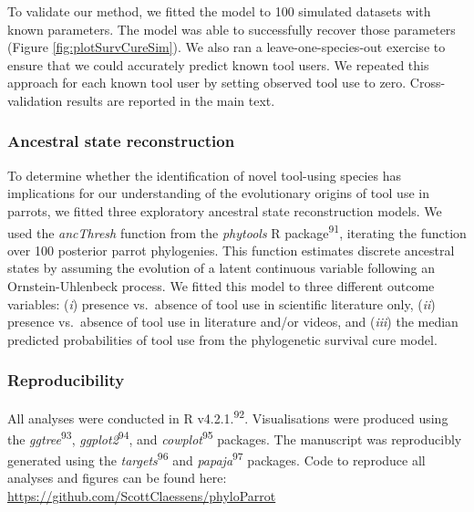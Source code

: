 \documentclass[
  man, donotrepeattitle,floatsintext]{apa6}
\begin{document}
To validate our method, we fitted the model to 100 simulated datasets with known
parameters. The model was able to successfully recover those parameters
(Figure \ref{fig:plotSurvCureSim}). We also ran a
leave-one-species-out exercise to ensure that we could accurately predict known
tool users. We repeated this approach for each known tool user by setting
observed tool use to zero. Cross-validation results are reported in the main
text.

\hypertarget{ancestral-state-reconstruction}{%
\subsubsection{Ancestral state reconstruction}\label{ancestral-state-reconstruction}}

To determine whether the identification of novel tool-using species has
implications for our understanding of the evolutionary origins of tool use in
parrots, we fitted three exploratory ancestral state reconstruction models. We
used the \emph{ancThresh} function from the \emph{phytools} R package\textsuperscript{91},
iterating the function over 100 posterior parrot phylogenies. This function
estimates discrete ancestral states by assuming the evolution of a latent
continuous variable following an Ornstein-Uhlenbeck process. We fitted this
model to three different outcome variables: (\emph{i}) presence vs.~absence of tool
use in scientific literature only, (\emph{ii}) presence vs.~absence of tool use in
literature and/or videos, and (\emph{iii}) the median predicted probabilities of tool
use from the phylogenetic survival cure model.

\hypertarget{reproducibility}{%
\subsubsection{Reproducibility}\label{reproducibility}}

All analyses were conducted in R v4.2.1.\textsuperscript{92}. Visualisations were
produced using the \emph{ggtree}\textsuperscript{93}, \emph{ggplot2}\textsuperscript{94}, and \emph{cowplot}\textsuperscript{95} packages. The manuscript was reproducibly generated using the
\emph{targets}\textsuperscript{96} and \emph{papaja}\textsuperscript{97} packages. Code to reproduce all
analyses and figures can be found here:
\url{https://github.com/ScottClaessens/phyloParrot}

\newpage
\nolinenumbers
\vspace*{60mm}
\end{document}

